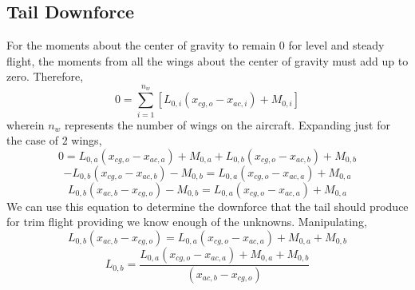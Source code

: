 \subsection{Tail Downforce}
\begin{comment}
\end{comment}
For the moments about the center of gravity to remain $0$ for level and steady flight, the moments from all the wings about the center of gravity must add up to zero. Therefore,
$$0 = \sum^{n_{w}}_{i = 1}\left[L_{0,i}(x_{cg,o}-x_{ac,i}) + M_{0,i}\right]$$
wherein $n_{w}$ represents the number of wings on the aircraft. Expanding just for the case of $2$ wings,
$$0 = L_{0,a}(x_{cg,o}-x_{ac,a}) + M_{0,a} + L_{0,b}(x_{cg,o}-x_{ac,b}) + M_{0,b}$$
$$ - L_{0,b}(x_{cg,o}-x_{ac,b}) - M_{0,b} = L_{0,a}(x_{cg,o}-x_{ac,a}) + M_{0,a}$$
$$L_{0,b}(x_{ac,b}-x_{cg,o}) - M_{0,b} = L_{0,a}(x_{cg,o}-x_{ac,a}) + M_{0,a}$$
We can use this equation to determine the downforce that the tail should produce for trim flight providing we know enough of the unknowns. Manipulating,
$$L_{0,b}(x_{ac,b}-x_{cg,o}) = L_{0,a}(x_{cg,o}-x_{ac,a}) + M_{0,a} + M_{0,b}$$
\begin{equation}L_{0,b} = \frac{L_{0,a}(x_{cg,o}-x_{ac,a}) + M_{0,a} + M_{0,b}}{(x_{ac,b}-x_{cg,o})} \label{tail downforce}\end{equation}

